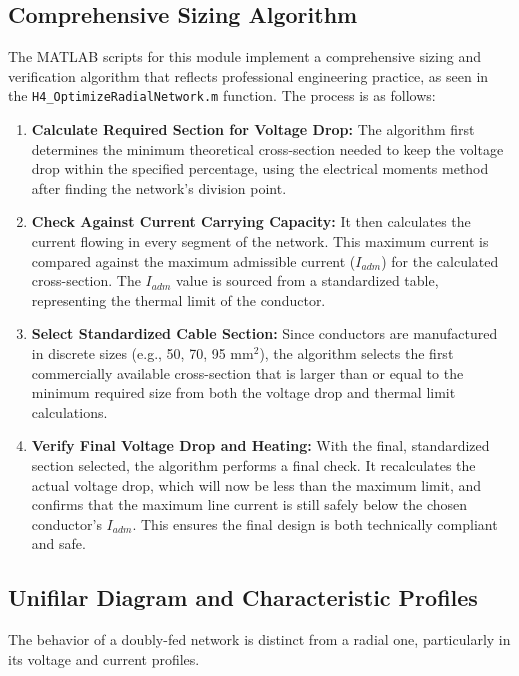 \documentclass[12pt, a4paper]{article}
\begin{document}
\subsection{Comprehensive Sizing Algorithm}
The MATLAB scripts for this module implement a comprehensive sizing and verification algorithm that reflects professional engineering practice, as seen in the \texttt{H4\_OptimizeRadialNetwork.m} function. The process is as follows:
\begin{enumerate}
    \item \textbf{Calculate Required Section for Voltage Drop:} The algorithm first determines the minimum theoretical cross-section needed to keep the voltage drop within the specified percentage, using the electrical moments method after finding the network's division point.
    \item \textbf{Check Against Current Carrying Capacity:} It then calculates the current flowing in every segment of the network. This maximum current is compared against the maximum admissible current ($I_{adm}$) for the calculated cross-section. The $I_{adm}$ value is sourced from a standardized table, representing the thermal limit of the conductor.
    \item \textbf{Select Standardized Cable Section:} Since conductors are manufactured in discrete sizes (e.g., 50, 70, 95 $\text{mm}^2$), the algorithm selects the first commercially available cross-section that is larger than or equal to the minimum required size from both the voltage drop and thermal limit calculations.
    \item \textbf{Verify Final Voltage Drop and Heating:} With the final, standardized section selected, the algorithm performs a final check. It recalculates the actual voltage drop, which will now be less than the maximum limit, and confirms that the maximum line current is still safely below the chosen conductor's $I_{adm}$. This ensures the final design is both technically compliant and safe.
\end{enumerate}

\subsection{Unifilar Diagram and Characteristic Profiles}
The behavior of a doubly-fed network is distinct from a radial one, particularly in its voltage and current profiles.
\end{document}
